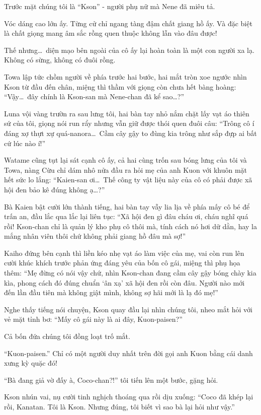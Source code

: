 \documentclass[../main.tex]{subfiles}
\begin{document}
Trước mặt chúng tôi là ``Kson'' - người phụ nữ mà Nene đã miêu tả.

Vóc dáng cao lớn ấy. Từng cử chỉ ngang tàng đậm chất giang hồ ấy. Và đặc biệt là chất giọng mang âm sắc rồng quen thuộc không lẫn vào đâu được!

Thế nhưng\dots\ diện mạo bên ngoài của cô ấy lại hoàn toàn là một con người xa lạ. Không có sừng, không có đuôi rồng.

Towa lập tức chồm người về phía trước hai bước, hai mắt tròn xoe ngước nhìn Kson từ đầu đến chân, miệng thì thầm với giọng còn chưa hết bàng hoàng: ``Vậy\dots\ đây chính là Kson-san mà Nene-chan đã kể sao\dots?''

Luna vội vàng trườn ra sau lưng tôi, hai bàn tay nhỏ nắm chặt lấy vạt áo thiên sứ của tôi, giọng nói run rẩy nhưng vẫn giữ được thói quen đuôi câu: ``Trông cô í đáng xợ thựt xự quá-nanora\dots\ Cầm cây gậy to đùng kia trông như sắp đựp ai bất cứ lúc nào í!''

Watame cũng tụt lại sát cạnh cô ấy, cả hai cùng trốn sau bóng lưng của tôi và Towa, nàng Cừu chỉ dám nhô nửa đầu ra hỏi mẹ của anh Kuon với khuôn mặt hết sức lo lắng: ``Kaien-san ơi\dots\ Thế công ty vật liệu này của cô có phải được xã hội đen bảo kê đúng không ạ\dots?''

Bà Kaien bật cười lớn thành tiếng, hai bàn tay vẫy lia lịa về phía mấy cô bé để trấn an, đầu lắc qua lắc lại liên tục: ``Xã hội đen gì đâu cháu ơi, cháu nghĩ quá rồi! Kson-chan chỉ là quản lý kho phụ cô thôi mà, tính cách nó hơi dữ dằn, hay la mắng nhân viên thôi chứ không phải giang hồ đâu mà sợ!''

Kaiho đứng bên cạnh thì liền kéo nhẹ vạt áo làm việc của mẹ, vai còn run lên cười khúc khích trước phản ứng đáng yêu của bốn cô gái, miệng thì phụ họa thêm: ``Mẹ đừng có nói vậy chứ, nhìn Kson-chan đang cầm cây gậy bóng chày kia kìa, phong cách đó đúng chuẩn `ân xạ' xã hội đen rồi còn đâu. Người nào mới đến lần đầu tiên mà không giật mình, không sợ hãi mới là lạ đó mẹ!''

Nghe thấy tiếng nói chuyện, Kson quay đầu lại nhìn chúng tôi, nheo mắt hỏi với vẻ mặt tỉnh bơ: ``Mấy cô gái này là ai đây, Kuon-paisen?''

Cả bốn đứa chúng tôi đồng loạt trố mắt.

``Kuon-paisen.'' Chỉ có một người duy nhất trên đời gọi anh Kuon bằng cái danh xưng kỳ quặc đó!

``Bà đang giả vờ đấy à, Coco-chan?!'' tôi tiến lên một bước, gặng hỏi.

Kson nhún vai, nụ cười tinh nghịch thoáng qua rồi dịu xuống: ``Coco đã khép lại rồi, Kanatan. Tôi là Kson. Nhưng đúng, tôi biết vì sao bà lại hỏi như vậy.''
\end{document}
